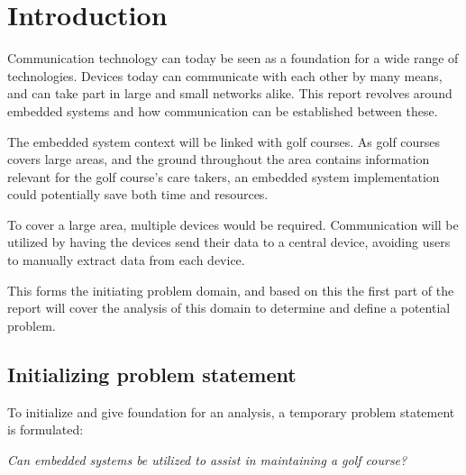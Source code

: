 \chapter{Introduction}
Communication technology can today be seen as a foundation for a wide range of technologies. Devices today can communicate with each other by many means, and can take part in large and small networks alike. This report revolves around embedded systems and how communication can be established between these.

The embedded system context will be linked with golf courses. As golf courses covers large areas, and the ground throughout the area contains information relevant for the golf course's care takers, an embedded system implementation could potentially save both time and resources. 

To cover a large area, multiple devices would be required. Communication will be utilized by having the devices send their data to a central device, avoiding users to manually extract data from each device.

This forms the initiating problem domain, and based on this the first part of the report will cover the analysis of this domain to determine and define a potential problem.


\section*{Initializing problem statement}
To initialize and give foundation for an analysis, a temporary problem statement is formulated:

\textit{Can embedded systems be utilized to assist in maintaining a golf course?}